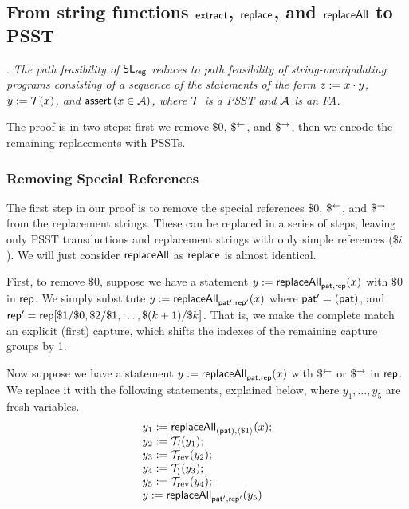 \subsection{From string functions $\mathsf{extract}$, $\mathsf{replace}$, and $\mathsf{replaceAll}$ to PSST}\label{appendix:sec-extract-replace-to-psst}

    \medskip

    .
    \emph{The path feasibility of $\mathsf{SL}_{\sf reg}$ reduces to path feasibility of string-manipulating programs consisting of a sequence of the statements of the form $z:=x \cdot y$, $y:=\mathcal{T}(x)$, and $\textsf{assert}\left(x \in \mathcal{A}\right)$, where $\mathcal{T}$ is a PSST and $\mathcal{A}$ is an FA.}

    The proof is in two steps: first we remove $\$0$, $\$^{\leftarrow}$, and $\$^{\rightarrow}$, then we encode the remaining replacements with PSSTs.

    \subsubsection{Removing Special References}


    The first step in our proof is to remove the special references $\$0$, $\$^{\leftarrow}$, and $\$^{\rightarrow}$ from the replacement strings.
    These can be replaced in a series of steps, leaving only PSST transductions and replacement strings with only simple references ($\$i$).
    We will just consider $\mathsf{replaceAll}$ as $\mathsf{replace}$ is almost identical.

    First, to remove $\$0$, suppose we have a statement
    $y := \mathsf{replaceAll}_{\mathsf{pat}, \mathsf{rep}}(x)$
    with $\$0$ in $\mathsf{rep}$.
    We simply substitute
    $y := \mathsf{replaceAll}_{\mathsf{pat}', \mathsf{rep}'}(x)$
    where
        $\mathsf{pat}' = (\mathsf{pat})$, and
        $\mathsf{rep}' = \mathsf{rep}[\$1 / \$0, \$2 / \$1, \ldots, \$(k+1) / \$k]$.
    That is, we make the complete match an explicit (first) capture, which shifts the indexes of the remaining capture groups by 1.

    Now suppose we have a statement
    $y := \mathsf{replaceAll}_{\mathsf{pat}, \mathsf{rep}}(x)$
    with $\$^{\leftarrow}$ or $\$^{\rightarrow}$ in $\mathsf{rep}$.
    We replace it with the following statements, explained below, where
    $y_1, \ldots, y_5$
    are fresh variables.
    \[
        \begin{array}{l}
            y_1 := \mathsf{replaceAll}_{(\mathsf{pat}), \langle\$1\rangle}(x); \\
            y_2 := \mathcal{T}_{\langle}(y_1); \\
            y_3 := \mathcal{T}_{\mathrm{rev}}(y_2); \\
            y_4 := \mathcal{T}_{\rangle}(y_3); \\
            y_5 := \mathcal{T}_{\mathrm{rev}}(y_4); \\
            y := \mathsf{replaceAll}_{\mathsf{pat}', \mathsf{rep}'}(y_5)
        \end{array}
    \]

